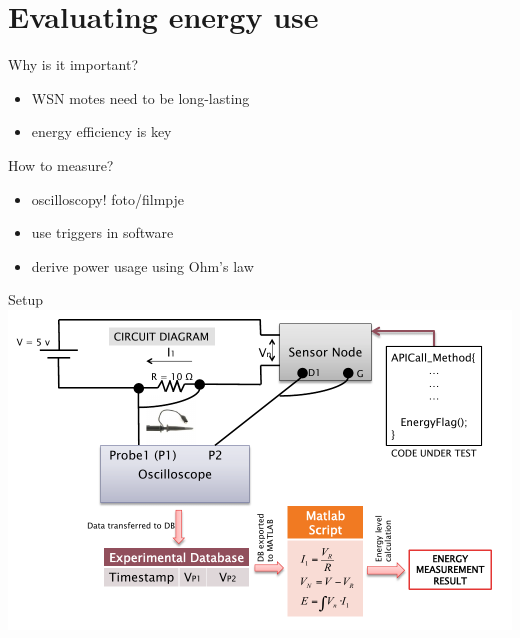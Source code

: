 \documentclass[presentation, bigger]{beamer}
\begin{document}
\section{Evaluating energy use}
\label{sec-3}

\begin{frame}[label=sec-3-1]{Why is it important?}
\begin{itemize}
\item WSN motes need to be long-lasting
\item energy efficiency is key
\end{itemize}
\end{frame}

\begin{frame}[label=sec-3-2]{How to measure?}
\begin{itemize}
\item oscilloscopy!
foto/filmpje
\item use triggers in software
\item derive power usage using Ohm's law
\end{itemize}
\end{frame}

\begin{frame}[label=sec-3-3]{Setup}
\includegraphics[width=\textwidth,keepaspectration=true]{energy_measurement_diagram}
\end{frame}
\end{document}
